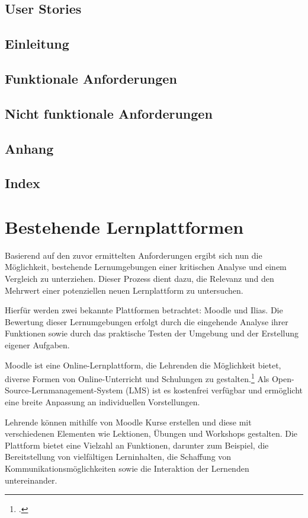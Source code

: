 \subsection{User Stories}

\subsection{Einleitung}
\subsection{Funktionale Anforderungen}
\subsection{Nicht funktionale Anforderungen}
\subsection{Anhang}
\subsection{Index}

\section{Bestehende Lernplattformen}
Basierend auf den zuvor ermittelten Anforderungen ergibt sich nun die Möglichkeit, bestehende Lernumgebungen einer kritischen Analyse und einem Vergleich zu unterziehen. Dieser Prozess dient dazu, die Relevanz und den Mehrwert einer potenziellen neuen Lernplattform zu untersuchen.

Hierfür werden zwei bekannte Plattformen betrachtet: Moodle und Ilias.
Die Bewertung dieser Lernumgebungen erfolgt durch die eingehende Analyse ihrer Funktionen sowie durch das praktische Testen der Umgebung und der Erstellung eigener Aufgaben.

Moodle ist eine Online-Lernplattform, die Lehrenden die Möglichkeit bietet, diverse Formen von Online-Unterricht und Schulungen zu gestalten.\footcite{moodle}
Als Open-Source-Lernmanagement-System (LMS) ist es kostenfrei verfügbar und ermöglicht eine breite Anpassung an individuellen Vorstellungen.

Lehrende können mithilfe von Moodle Kurse erstellen und diese mit verschiedenen Elementen wie Lektionen, Übungen und Workshops gestalten. Die Plattform bietet eine Vielzahl an Funktionen, darunter zum Beispiel, die Bereitstellung von vielfältigen Lerninhalten, die Schaffung von Kommunikationsmöglichkeiten sowie die Interaktion der Lernenden untereinander.

